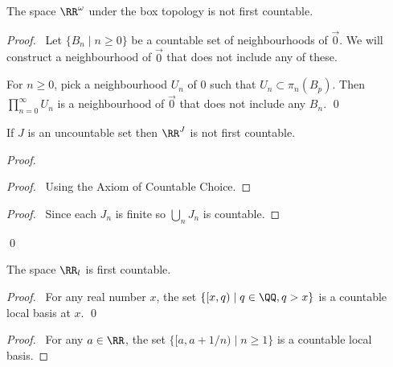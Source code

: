 \begin{example}[CC]
    The space $\RR^\omega$ under the box topology is not first countable.
\end{example}

\begin{proof}
    \pf\ Let $\{ B_n \mid n \geq 0 \}$ be a countable set of neighbourhoods of $\vec{0}$. We will construct a neighbourhood of $\vec{0}$ that does not include any of these.

    For $n \geq 0$, pick a neighbourhood $U_n$ of 0 such that $U_n \subset \pi_n(B_p)$. Then $\prod_{n=0}^\infty U_n$ is a neighbourhood of $\vec{0}$ that does not
    include any $B_n$. \qed
\end{proof}

\begin{example}
    If $J$ is an uncountable set then $\RR^J$ is not first countable.
\end{example}

\begin{proof}
    \pf
    \begin{proof}
        \pf\ Using the Axiom of Countable Choice.
    \end{proof}
    \begin{proof}
        \pf\ Since each $J_n$ is finite so $\bigcup_n J_n$ is countable.
    \end{proof}
    \qed
\end{proof}

\begin{example}
    The space $\RR_l$ is first countable.

    \begin{proof}
        \pf\ For any real number $x$, the set $\{ [x,q) \mid q \in \QQ, q > x \}$
        is a countable local basis at $x$. \qed
    \end{proof}
\end{example}

\begin{proof}
    \pf\ For any $a \in \RR$, the set $\{ [a,a + 1/n) \mid n \geq 1 \}$ is a countable local basis.
\end{proof}

